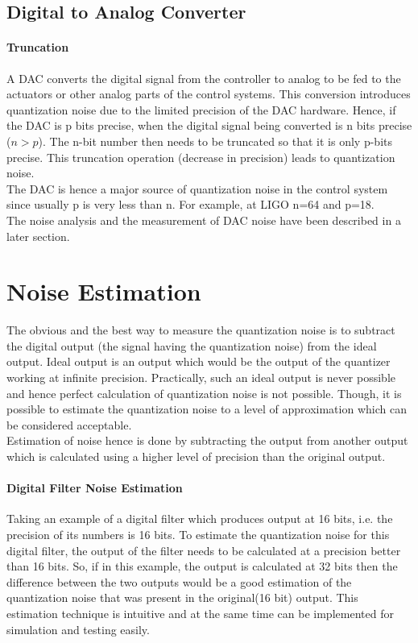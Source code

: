 \documentclass[colorlinks=true,pdfstartview=FitV,linkcolor=blue,
            citecolor=red,urlcolor=magenta]{ligodoc}
\begin{document}
    
    
	\subsection{Digital to Analog Converter}
    		\paragraph{Truncation}
    		A DAC converts the digital signal from the controller to analog to be fed to the actuators or other analog parts of the control systems. This conversion introduces quantization noise due to the limited precision of the DAC hardware. Hence, if the DAC is p bits precise, when the digital signal being converted is n bits precise ($n>p$). The n-bit number then needs to be truncated so that it is only p-bits precise. This truncation operation (decrease in precision) leads to quantization noise. \\
    		The DAC is hence a major source of quantization noise in the control system since usually p is very less than n. For example, at LIGO n=64 and p=18. \\
    		The noise analysis and the measurement of DAC noise have been described in a later section.
     

\section{Noise Estimation}
The obvious and the best way to measure the quantization noise is to subtract the digital output (the signal having the quantization noise) from the ideal output. Ideal output is an output which would be the output of the quantizer working at infinite precision. Practically, such an ideal output is never possible and hence perfect calculation of quantization noise is not possible. Though, it is possible to estimate the quantization noise to a level of approximation which can be considered acceptable. \\
Estimation of noise hence is done by subtracting the output from another output which is calculated using a higher level of precision than the original output. 

	\paragraph{Digital Filter Noise Estimation} Taking an example of a digital filter which produces output at 16 bits, i.e. the precision of its numbers is 16 bits. To estimate the quantization noise for this digital filter, the output of the filter needs to be calculated at a precision better than 16 bits. So, if in this example, the output is calculated at 32 bits then the difference between the two outputs would be a good estimation of the quantization noise that was present in the original(16 bit) output. This estimation technique is intuitive and at the same time can be implemented for simulation and testing easily.
\end{document}
